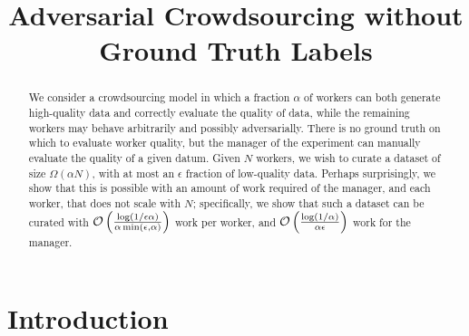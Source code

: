 \documentclass[anon,12pt]{colt2016} %
\title[Adversarial Crowdsourcing without Ground Truth Labels]{Adversarial Crowdsourcing without Ground Truth Labels}
\newcommand{\goodfrac}{\alpha}
\newcommand{\quality}{\epsilon}
\begin{document}
\maketitle

\begin{abstract}
We consider a crowdsourcing model in which a fraction $\goodfrac$ of 
workers can both generate high-quality data and correctly evaluate 
the quality of data, while the remaining workers may behave arbitrarily and possibly adversarially. 
There is no ground truth on which to evaluate worker quality, but the 
manager of the experiment can manually evaluate the quality of 
a given datum. Given $N$ workers, we wish to curate a dataset 
of size $\Omega(\goodfrac N)$, with at most an $\quality$ fraction of low-quality 
data.  Perhaps surprisingly, we show that this is possible with an amount of work required of the manager, and each worker, that does not scale with $N$; specifically, we show that such a dataset can be curated with
$\oo\p{\frac{\log(1/\quality\goodfrac)}{\goodfrac\min\p{\quality,\goodfrac}}}$ 
work per worker, and $\oo\p{\frac{\log(1/\goodfrac)}{\goodfrac\quality}}$ 
work for the manager.
\end{abstract}

\begin{keywords}
\end{keywords}

\section{Introduction}
\end{document}

